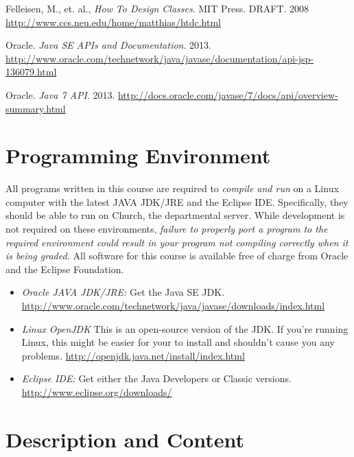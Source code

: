 \documentclass[10pt]{article}
\begin{document}
Felleisen, M., et. al., \textit{How To Design Classes}. MIT Press. DRAFT. 2008
\newline
\url{http://www.ccs.neu.edu/home/matthias/htdc.html}
\vspace{.25in}

Oracle. \textit{Java SE APIs and Documentation}. 2013. 
\newline
\url{http://www.oracle.com/technetwork/java/javase/documentation/api-jsp-136079.html}
\vspace{.25in}

Oracle. \textit{Java 7 API}. 2013.
\newline
\url{http://docs.oracle.com/javase/7/docs/api/overview-summary.html}


\section{Programming Environment}
All programs written in this course are required to \emph{compile and run} on a Linux computer with the latest JAVA JDK/JRE and the Eclipse IDE.  Specifically, they should be able to run on Church, the departmental server.  While development is not required on these environments, \emph{failure to properly port a program to the required environment could result in your program not compiling correctly when it is being graded.}  All software for this course is available free of charge from Oracle and the Eclipse Foundation.
\begin{itemize}
\item \emph{Oracle JAVA JDK/JRE:}  Get the Java SE JDK. 
\newline \url{http://www.oracle.com/technetwork/java/javase/downloads/index.html}
\item \textit{Linux OpenJDK} This is an open-source version of the JDK.  If you're running Linux, this might be easier for your to install and shouldn't cause you any problems.\newline
\url{http://openjdk.java.net/install/index.html} 
\item \emph{Eclipse IDE:} Get either the Java Developers or Classic versions. \newline
\url{http://www.eclipse.org/downloads/} 
\end{itemize} 


\section{Description and Content}
\end{document}
